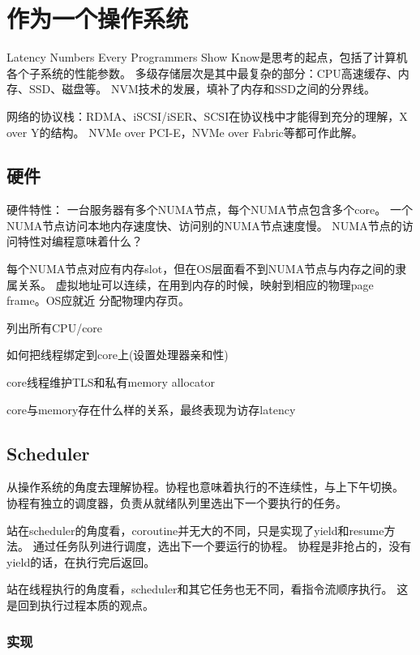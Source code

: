 \chapter{作为一个操作系统}

Latency Numbers Every Programmers Show Know是思考的起点，包括了计算机各个子系统的性能参数。
多级存储层次是其中最复杂的部分：CPU高速缓存、内存、SSD、磁盘等。
NVM技术的发展，填补了内存和SSD之间的分界线。

网络的协议栈：RDMA、iSCSI/iSER、SCSI在协议栈中才能得到充分的理解，X over Y的结构。
NVMe over PCI-E，NVMe over Fabric等都可作此解。

\section{硬件}

硬件特性： 一台服务器有多个NUMA节点，每个NUMA节点包含多个core。
一个NUMA节点访问本地内存速度快、访问别的NUMA节点速度慢。
NUMA节点的访问特性对编程意味着什么？

每个NUMA节点对应有内存slot，但在OS层面看不到NUMA节点与内存之间的隶属关系。
虚拟地址可以连续，在用到内存的时候，映射到相应的物理page frame。OS应就近
分配物理内存页。

\begin{enumbox}
\item 列出所有CPU/core
\item 如何把线程绑定到core上(设置处理器亲和性)
\item core线程维护TLS和私有memory allocator
\item core与memory存在什么样的关系，最终表现为访存latency
\end{enumbox}

\section{Scheduler}

从操作系统的角度去理解协程。协程也意味着执行的不连续性，与上下午切换。
协程有独立的调度器，负责从就绪队列里选出下一个要执行的任务。

站在scheduler的角度看，coroutine并无大的不同，只是实现了yield和resume方法。
通过任务队列进行调度，选出下一个要运行的协程。
协程是非抢占的，没有yield的话，在执行完后返回。

站在线程执行的角度看，scheduler和其它任务也无不同，看指令流顺序执行。
这是回到执行过程本质的观点。

\subsection{实现}

